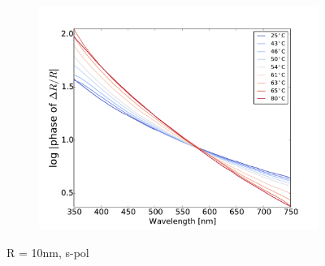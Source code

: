 \begin{figure}
    \begin{subfigure}[b]{0.3\textwidth}
        \centering
        \includegraphics[width=\textwidth]{Results/Sim2/dRphase_visible_log.pdf}
        \caption{}
    \end{subfigure}
    \caption{R = 10nm, s-pol}
\end{figure}
%
